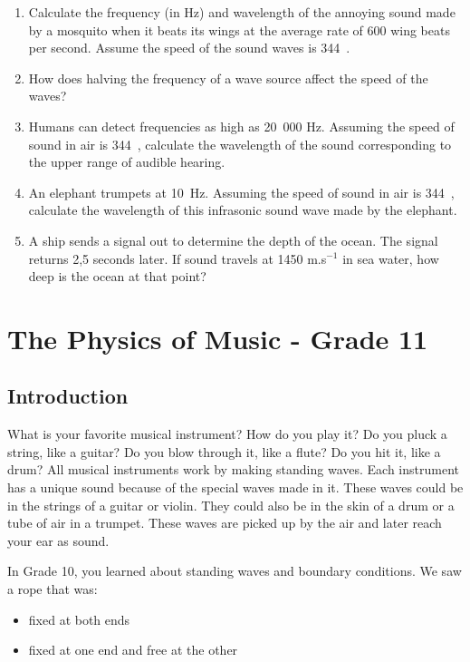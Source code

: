 \begin{enumerate}
\item{Calculate the frequency (in Hz) and wavelength of the annoying sound made by a mosquito when it beats its wings at the average rate of 600 wing beats per second. Assume the speed of the sound waves is 344~\ms.}
\item{How does halving the frequency of a wave source affect the speed of the waves?}
\item{Humans can detect frequencies as high as 20~000 Hz. Assuming the speed of sound in air is 344~\ms, calculate the wavelength of the sound corresponding to the upper range of audible hearing.}
\item{An elephant trumpets at 10~Hz. Assuming the speed of sound in air is 344~\ms, calculate the wavelength of this infrasonic sound wave made by the elephant.}

\item A ship sends a signal out to determine the depth of the ocean. The signal returns 2,5 seconds later. If sound travels at
1450 m.s$^{-1}$ in sea water, how deep is the ocean at that point?

\end{enumerate}






\chapter{The Physics of Music - Grade 11}
\label{p:wsl:pm11}


\section{Introduction}
What is your favorite musical instrument? How do you play it? Do you pluck a string, like a guitar? 
Do you blow through it, like a flute? Do you hit it, like a drum? 
All musical instruments work by making standing waves. Each instrument has a unique sound because of the special waves made in it. 
These waves could be in the strings of a guitar or violin. 
They could also be in the skin of a drum or a tube of air in a trumpet.  
These waves are picked up by the air and later reach your ear as sound.

In Grade 10, you learned about standing waves and boundary conditions. We saw a rope that was:
\begin{itemize}
\item{fixed at both ends}
\item{fixed at one end and free at the other}
\end{itemize}



